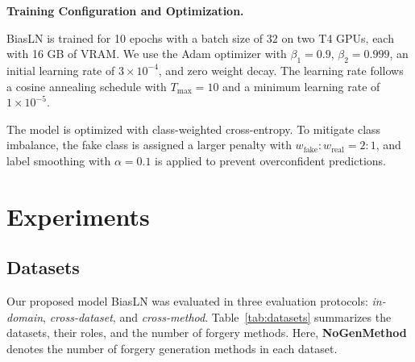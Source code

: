 \documentclass[fonts]{icst}
\begin{document}
\noindent\textbf{Training Configuration and Optimization.}\par
BiasLN is trained for 10 epochs with a batch size of 32 on two T4 GPUs, each with 16 GB of VRAM.
We use the Adam optimizer with $\beta_1 = 0.9$, $\beta_2 = 0.999$, an initial learning rate of $3 \times 10^{-4}$, and zero weight decay.
The learning rate follows a cosine annealing schedule with $T_{\max}=10$ and a minimum learning rate of $1 \times 10^{-5}$.

The model is optimized with class-weighted cross-entropy. To mitigate class imbalance, the fake class is assigned a larger penalty with $w_{\mathrm{fake}}:w_{\mathrm{real}} = 2:1$, and label smoothing with $\alpha = 0.1$ is applied to prevent overconfident predictions.


\section{Experiments}
\subsection{Datasets}
\label{sec:datasets}

Our proposed model BiasLN was evaluated in three evaluation protocols: \textit{in-domain}, \textit{cross-dataset}, and \textit{cross-method}.
Table~\ref{tab:datasets} summarizes the datasets, their roles, and the number of forgery methods.
Here, \textbf{NoGenMethod} denotes the number of forgery generation methods in each dataset.
\end{document}
